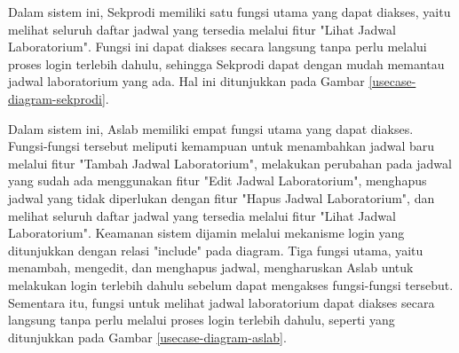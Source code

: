 Dalam sistem ini, Sekprodi memiliki satu fungsi utama yang dapat diakses, yaitu melihat seluruh daftar jadwal yang tersedia melalui fitur "Lihat Jadwal Laboratorium". Fungsi ini dapat diakses secara langsung tanpa perlu melalui proses login terlebih dahulu, sehingga Sekprodi dapat dengan mudah memantau jadwal laboratorium yang ada. Hal ini ditunjukkan pada Gambar \ref{usecase-diagram-sekprodi}.

Dalam sistem ini, Aslab memiliki empat fungsi utama yang dapat diakses. Fungsi-fungsi tersebut meliputi kemampuan untuk menambahkan jadwal baru melalui fitur "Tambah Jadwal Laboratorium", melakukan perubahan pada jadwal yang sudah ada menggunakan fitur "Edit Jadwal Laboratorium", menghapus jadwal yang tidak diperlukan dengan fitur "Hapus Jadwal Laboratorium", dan melihat seluruh daftar jadwal yang tersedia melalui fitur "Lihat Jadwal Laboratorium". Keamanan sistem dijamin melalui mekanisme login yang ditunjukkan dengan relasi "include" pada diagram. Tiga fungsi utama, yaitu menambah, mengedit, dan menghapus jadwal, mengharuskan Aslab untuk melakukan login terlebih dahulu sebelum dapat mengakses fungsi-fungsi tersebut. Sementara itu, fungsi untuk melihat jadwal laboratorium dapat diakses secara langsung tanpa perlu melalui proses login terlebih dahulu, seperti yang ditunjukkan pada Gambar \ref{usecase-diagram-aslab}.



